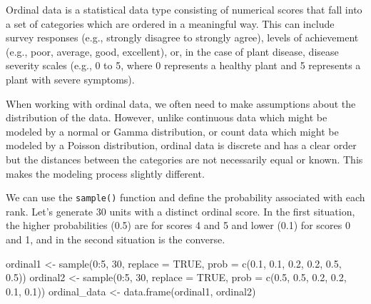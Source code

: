 \documentclass[
  letterpaper,
  DIV=11,
  numbers=noendperiod]{scrreprt}
\newenvironment{Shaded}{\begin{snugshade}}{\end{snugshade}}
\newcommand{\AttributeTok}[1]{\textcolor[rgb]{0.40,0.45,0.13}{#1}}
\newcommand{\ConstantTok}[1]{\textcolor[rgb]{0.56,0.35,0.01}{#1}}
\newcommand{\DecValTok}[1]{\textcolor[rgb]{0.68,0.00,0.00}{#1}}
\newcommand{\FloatTok}[1]{\textcolor[rgb]{0.68,0.00,0.00}{#1}}
\newcommand{\FunctionTok}[1]{\textcolor[rgb]{0.28,0.35,0.67}{#1}}
\newcommand{\NormalTok}[1]{\textcolor[rgb]{0.00,0.23,0.31}{#1}}
\newcommand{\OtherTok}[1]{\textcolor[rgb]{0.00,0.23,0.31}{#1}}
\newcommand{\SpecialCharTok}[1]{\textcolor[rgb]{0.37,0.37,0.37}{#1}}
\begin{document}
Ordinal data is a statistical data type consisting of numerical scores
that fall into a set of categories which are ordered in a meaningful
way. This can include survey responses (e.g., strongly disagree to
strongly agree), levels of achievement (e.g., poor, average, good,
excellent), or, in the case of plant disease, disease severity scales
(e.g., 0 to 5, where 0 represents a healthy plant and 5 represents a
plant with severe symptoms).

When working with ordinal data, we often need to make assumptions about
the distribution of the data. However, unlike continuous data which
might be modeled by a normal or Gamma distribution, or count data which
might be modeled by a Poisson distribution, ordinal data is discrete and
has a clear order but the distances between the categories are not
necessarily equal or known. This makes the modeling process slightly
different.

We can use the \texttt{sample()} function and define the probability
associated with each rank. Let's generate 30 units with a distinct
ordinal score. In the first situation, the higher probabilities (0.5)
are for scores 4 and 5 and lower (0.1) for scores 0 and 1, and in the
second situation is the converse.

\begin{Shaded}
\begin{Highlighting}[]
\NormalTok{ordinal1 }\OtherTok{\textless{}{-}} \FunctionTok{sample}\NormalTok{(}\DecValTok{0}\SpecialCharTok{:}\DecValTok{5}\NormalTok{, }\DecValTok{30}\NormalTok{, }\AttributeTok{replace =} \ConstantTok{TRUE}\NormalTok{, }\AttributeTok{prob =} \FunctionTok{c}\NormalTok{(}\FloatTok{0.1}\NormalTok{, }\FloatTok{0.1}\NormalTok{, }\FloatTok{0.2}\NormalTok{, }\FloatTok{0.2}\NormalTok{, }\FloatTok{0.5}\NormalTok{, }\FloatTok{0.5}\NormalTok{))}
\NormalTok{ordinal2 }\OtherTok{\textless{}{-}} \FunctionTok{sample}\NormalTok{(}\DecValTok{0}\SpecialCharTok{:}\DecValTok{5}\NormalTok{, }\DecValTok{30}\NormalTok{, }\AttributeTok{replace =} \ConstantTok{TRUE}\NormalTok{, }\AttributeTok{prob =} \FunctionTok{c}\NormalTok{(}\FloatTok{0.5}\NormalTok{, }\FloatTok{0.5}\NormalTok{, }\FloatTok{0.2}\NormalTok{, }\FloatTok{0.2}\NormalTok{, }\FloatTok{0.1}\NormalTok{, }\FloatTok{0.1}\NormalTok{))}
\NormalTok{ordinal\_data }\OtherTok{\textless{}{-}} \FunctionTok{data.frame}\NormalTok{(ordinal1, ordinal2)}
\end{Highlighting}
\end{Shaded}
\end{document}
